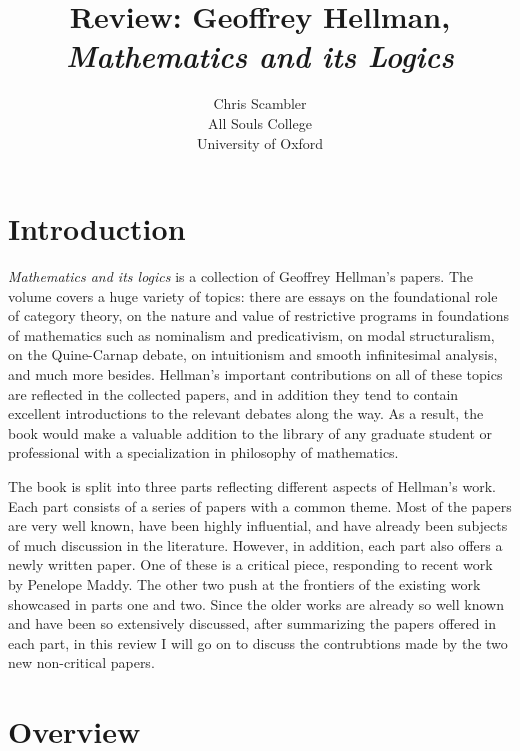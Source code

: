 \documentclass{amsart}
\title{Review: Geoffrey Hellman, \emph{Mathematics and its Logics}}
\author{Chris Scambler 
\\
All Souls College\\
University of Oxford}
\theoremstyle{definition}
\begin{document}
 
\maketitle

\section{Introduction}

\emph{Mathematics and its logics} is a collection of Geoffrey Hellman's papers. 
The volume covers a huge variety of topics:
there are essays on the foundational role of category theory, 
on the nature and value of restrictive programs in foundations of mathematics such as nominalism and predicativism, 
on modal structuralism, on the Quine-Carnap debate, 
on intuitionism and smooth infinitesimal analysis, 
and much more besides. 
Hellman's important contributions on all of these topics are reflected in the collected papers, 
and in addition they tend to contain excellent introductions to the relevant debates along the way.
As a result, 
the book would make a valuable addition to the library of any graduate student or professional with a specialization in philosophy of mathematics. 

The book is split into three parts reflecting different aspects of Hellman's work. 
Each part consists of a series of papers with a common theme.
Most of the papers are very well known, have been highly influential, 
and have already been subjects of much discussion in the literature.
However, in addition, 
each part also offers a newly written paper.
One of these is a critical piece, responding to recent work by Penelope Maddy. 
The other two push at the frontiers of the existing work showcased in parts one and two.
Since the older works are already so well known and have been so extensively discussed, 
after summarizing the papers offered in each part, 
in this review I will go on to discuss the contrubtions made by the two new non-critical papers.

\section{Overview}
\end{document}
